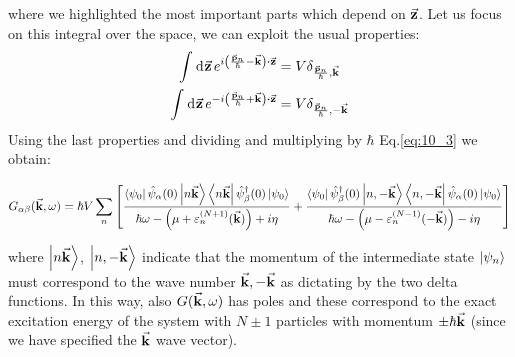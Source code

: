 \documentclass[../main/main.tex]{subfiles}
\begin{document}
where we highlighted the most important parts which depend on \( \va{z} \).
Let us focus on this integral over the space, we can exploit the usual properties:
\begin{subequations}
\begin{align*}
  \int_{}^{} \dd[]{\va{z}} e^{i \qty(\frac{\va{p}_n}{\hbar }-\va{k})\vdot \va{z} }   &= V \delta _{\frac{\va{p}_n}{\hbar },\va{k}} \\
  \int_{}^{} \dd[]{\va{z}} e^{-i \qty(\frac{\va{p}_n}{\hbar }+\va{k})\vdot \va{z} }   &= V \delta _{\frac{\va{p}_n}{\hbar },-\va{k}}
\end{align*}
\end{subequations}
Using the last properties and dividing and multiplying by \( \hbar  \) Eq.\eqref{eq:10_3} we obtain:
\begin{small}
\begin{equation}
  G_{\alpha \beta } (\va{k}, \omega )
  =  \hbar V \sum_{n}^{}
  \qty[
  \frac{\bra{\psi _0} \hat{\psi }_ \alpha
   (0) \ket{ n \va{k}} \bra{n \va{k}} \hat{\psi }_ \beta ^\dag (0) \ket{\psi _0}  }{ \hbar \omega - \qty( \mu + \varepsilon _n^{(N+1)}(\va{k})) + i \eta }
   +
  \frac{\bra{\psi _0} \hat{\psi }_ \beta ^\dag (0) \ket{n, -\va{k}} \bra{n, -\va{k}}  \hat{\psi }_ \alpha
  (0)  \ket{\psi _0}  }{  \hbar \omega - \qty( \mu - \varepsilon _n^{(N-1)} (-\va{k})) - i \eta } ]
  \label{eq:10_4}
\end{equation}
\end{small}
where \( \ket{ n \va{k}} \), \( \ket{ n,- \va{k}} \) indicate that the momentum of the intermediate state \( \ket{\psi _n}  \) must correspond to the wave number \( \va{k}, -\va{k} \) as dictating by the two delta functions.
In this way,  also \( G(\va{k}, \omega ) \) has poles and these correspond to the exact excitation energy of the system with \( N \pm 1\) particles with momentum \( \pm \hbar \va{k} \) (since we have specified the \( \va{k} \) wave vector).
\end{document}
